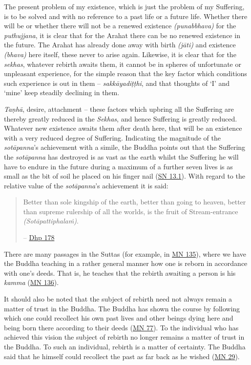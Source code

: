 The present problem of my existence, which is just the problem of my  Suffering, is to be solved  and  with no reference to a past life or a future life. Whether there will be or whether there will not be a renewed existence \emph{(punabbhava)} for the \emph{puthujjana}, it is clear that for the Arahat there can be no renewed existence in the future. The Arahat has already done away with birth \emph{(jāti)} and existence \emph{(bhava)} here itself, these never to arise again. Likewise, it is clear that for the \emph{sekhas}, whatever rebirth awaits them, it cannot be in spheres of unfortunate or unpleasant experience, for the simple reason that the key factor which conditions such experience is out in them -- \emph{sakkāyadiṭṭhi}, and that thoughts of `I' and `mine' keep steadily declining in them.

\emph{Taṇhā}, desire, attachment -- these factors which upbring all the Suffering are thereby greatly reduced in the \emph{Sekhas}, and hence Suffering is greatly reduced. Whatever new existence awaits them after death here, that will be an existence with a very reduced degree of Suffering. Indicating the magnitude of the \emph{sotāpanna}'s achievement with a simile, the Buddha points out that the Suffering the \emph{sotāpanna} has destroyed is as vast as the earth whilst the Suffering he will have to endure in the future during a maximum of a further seven lives is as small as the bit of soil he placed on his finger nail (\href{https://suttacentral.net/sn13.1/en/sujato}{SN 13.1}). With regard to the relative value of the \emph{sotāpanna}'s achievement it is said:

\begin{quote}
Better than sole kingship of the earth, better than going to heaven, better than supreme rulership of all the worlds, is the fruit of Stream-entrance \emph{(Sotāpattiphalaṁ)}.

 -- \href{https://suttacentral.net/dhp167-178/en/sujato}{Dhp 178}
\end{quote}

There are many passages in the Suttas (for example, in \href{https://suttacentral.net/mn135/en/bodhi}{MN 135}), where we have the Buddha teaching in a rather general manner how one is reborn in accordance with one's deeds. That is, he teaches that the rebirth awaiting a person is  his \emph{kamma} (\href{https://suttacentral.net/mn136/en/thanissaro}{MN 136}).

It should also be noted that the subject of rebirth need not always remain a matter of trust in the Buddha. The Buddha has shown the course by following which one could recollect his own past lives and  other beings dying here and being born there according to their deeds (\href{https://suttacentral.net/mn77/en/bodhi}{MN 77}). To the individual who has achieved this vision the subject of rebirth no longer remains a matter of trust in the Buddha. To such an individual, rebirth is a matter of certainty. The Buddha said that he himself could recollect the past as far back as he wished (\href{https://suttacentral.net/mn29/en/bodhi}{MN 29}).

